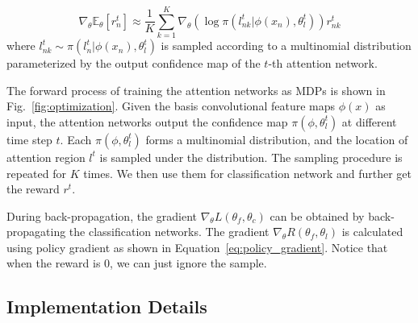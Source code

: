 \documentclass[10pt,twocolumn,letterpaper]{article}
\begin{document}
\begin{equation}
\nabla_{\theta} \mathbb{E}_{\theta}[r^t_n] \approx \frac{1}{K} \sum_{k=1}^K \nabla_{\theta} \left(\log \pi(l^t_{nk} | \phi(x_n), \theta^t_l)\right) r^t_{nk}
\label{eq:policy_gradient}
\end{equation}
where $l^t_{nk}\sim \pi(l^t_n | \phi(x_n), \theta^t_l) $ is sampled according to a multinomial distribution parameterized by the output confidence map of the $t$-th attention network.

The forward process of training the attention networks as MDPs is shown in Fig.~\ref{fig:optimization}. Given the basis convolutional feature maps $\phi(x)$ as input, the attention networks output the confidence map $\pi(\phi, \theta^t_l)$ at different time step $t$. Each $\pi(\phi, \theta^t_l)$ forms a multinomial distribution, and the location of attention region $l^t$ is sampled under the distribution. The sampling procedure is repeated for $K$ times. We then use them for classification network and further get the reward $r^t$.

During back-propagation, the gradient $\nabla_{\theta} L(\theta_f, \theta_c)$ can be  obtained by back-propagating the classification networks.
The gradient $\nabla_{\theta} R(\theta_f, \theta_l)$ is calculated using policy gradient as shown in Equation~\ref{eq:policy_gradient}.
Notice that when the reward is 0, we can just ignore the sample.

\subsection{Implementation Details}
\end{document}

